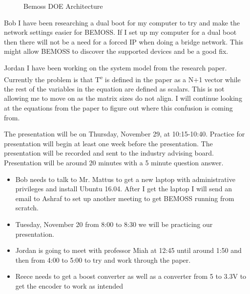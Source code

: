 \documentclass[fontsize=11pt, %
                             paper=letter, %
                             twoside, %
                             captions=tableheading,
                             index=totoc,
                             hyperref]{labbook}
\begin{document}
\begin{figure}
  
  \caption{Bemoss DOE Architecture}
  \label{fig:XBee Quick Reference Guide}
\end{figure}

Bob
I have been researching a dual boot for my computer to try and make the network settings easier for BEMOSS. If I set up my computer for a dual boot then there will not be a need for a forced IP when doing a bridge network. This might allow BEMOSS to discover the supported devices and be a good fix.

Jordan
I have been working on the system model from the research paper. Currently the problem is that T\textsuperscript{e} is defined in the paper as a N+1 vector while the rest of the variables in the equation are defined as scalars. This is not allowing me to move on as the matrix sizes do not align. I will continue looking at the equations from the paper to figure out where this confusion is coming from.

The presentation will be on Thursday, November 29, at 10:15-10:40. Practice for presentation will begin at least one week before the presentation. The presentation will be recorded and sent to the industry advising board. Presentation will be around 20 minutes with a 5 minute question answer. 
\begin{itemize}
    \item Bob needs to talk to Mr. Mattus to get a new laptop with administrative privileges and install Ubuntu 16.04. After I get the laptop I will send an email to Ashraf to set up another meeting to get BEMOSS running from scratch. 
    \item Tuesday, November 20 from 8:00 to 8:30 we will be practicing our presentation.
    \item Jordan is going to meet with professor Miah at 12:45 until around 1:50 and then from 4:00 to 5:00 to try and work through the paper. 
    \item Reece needs to get a boost converter as well as a converter from 5 to 3.3V to get the encoder to work as intended
\end{itemize}
\end{document}

